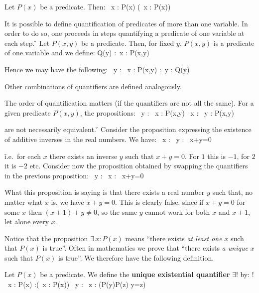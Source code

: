 \bt[]
Let $P(x)$ be a predicate. Then:
\bse
\forall \, x : P(x) \eqv \neg (\exists \, x : \neg P(x))
\ese
\et

It is possible to define quantification of predicates of more than one variable. In order to do so, one proceeds in
steps quantifying a predicate of one variable at each step. \v

\be
Let $P(x,y)$ be a predicate. Then, for fixed $y$, $P(x,y)$ is a predicate of one variable and we define:
\bse
Q(y) :\eqv \forall \, x : P(x,y)
\ese

Hence we may have the following:
\bse
\exists \, y : \forall \, x : P(x,y) :\eqv \exists \, y : Q(y)
\ese

Other combinations of quantifiers are defined analogously.
\ee

The order of quantification matters (if the quantifiers are not all the same). For a given predicate $P(x,y)$, the
propositions:
\bse
\exists \, y : \forall \, x : P(x,y) \quad {} \quad \forall \, x :
\exists \, y : P(x,y)
\ese

are not necessarily equivalent. \v

\be
Consider the proposition expressing the existence of additive inverses in the real numbers. We have:
\bse
\forall \, x : \exists \, y : \ x+y=0
\ese

\v

i.e.\ for each $x$ there exists an inverse $y$ such that $x+y=0$. For $1$ this is $-1$, for $2$ it is $-2$ etc.
Consider now the proposition obtained by swapping the quantifiers in the previous proposition:
\bse
\exists \, y : \forall \, x : \ x+y=0
\ese

\v

What this proposition is saying is that there exists a real number $y$ such that, no matter what $x$ is, we have
$x+y=0$. This is clearly false, since if $x+y=0$ for some $x$ then $(x+1) +y\neq 0$, so the same $y$ cannot work for
both $x$ and $x+1$, let alone every $x$. \ee

Notice that the proposition $\exists \, x : P(x)$ means ``there exists \emph{at least one} $x$ such that $P(x)$ is
true''. Often in mathematics we prove that ``there exists \emph{a unique} $x$ such that $P(x)$ is true''. We
therefore have the following definition.

Let $P(x)$ be a predicate. We define the \textbf{unique existential quantifier} $\exists !$ by:
\bse
\exists ! \, x : P(x) :\eqv (\exists \, x : P(x)) \land \forall \, y : \forall \, z : (P(y)\land P(z) \imp y=z)
\ese
\ed

